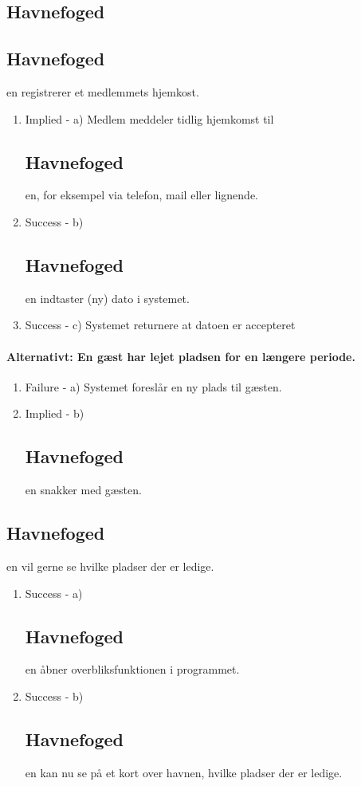 {{{{\subsection{Havnefoged}
	\item{\bf{\subsection{Havnefoged}en registrerer et medlemmets hjemkost.}}
	  \begin{enumerate}
			\item Implied -  a) Medlem meddeler tidlig hjemkomst til \subsection{Havnefoged}en, for eksempel via telefon, mail eller lignende.
			\item Success -  b) \subsection{Havnefoged}en indtaster (ny) dato i systemet.
			\item Success -  c) Systemet returnere at datoen er accepteret
	   \end{enumerate}

	\paragraph{Alternativt: En gæst har lejet pladsen for en længere periode.}
	 \begin{enumerate}
			\item Failure -  a) Systemet foreslår en ny plads til gæsten.
			\item Implied -  b) \subsection{Havnefoged}en snakker med gæsten.
	   \end{enumerate}
      
	\item{\bf{\subsection{Havnefoged}en vil gerne se hvilke pladser der er ledige.}}
	  \begin{enumerate}
			\item Success -  a) \subsection{Havnefoged}en åbner overbliksfunktionen i programmet.
			\item Success -  b) \subsection{Havnefoged}en kan nu se på et kort over havnen, hvilke pladser der er ledige.
	   \end{enumerate}
      
}}}}
